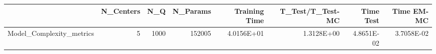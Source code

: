 \begin{tabular}{lrrrrrrr}
\toprule
{} &  N\_Centers &   N\_Q &  N\_Params &  Training Time &  T\_Test/T\_Test-MC &  Time Test &  Time EM-MC \\
\midrule
Model\_Complexity\_metrics &          5 &  1000 &    152005 &     4.0156E+01 &        1.3128E+00 & 4.8651E-02 &  3.7058E-02 \\
\bottomrule
\end{tabular}
